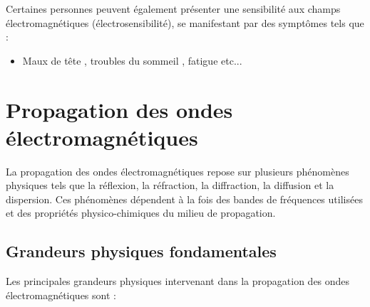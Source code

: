 \documentclass[12pt,a4paper]{article}
\begin{document}
Certaines personnes peuvent également présenter une sensibilité aux champs électromagnétiques (électrosensibilité), se manifestant par des symptômes tels que :

\begin{itemize}
    \item Maux de tête , troubles du sommeil , fatigue etc...
\end{itemize}

\section{Propagation des ondes électromagnétiques}

La propagation des ondes électromagnétiques repose sur plusieurs phénomènes physiques tels que la réflexion, la réfraction, la diffraction, la diffusion et la dispersion. Ces phénomènes dépendent à la fois des bandes de fréquences utilisées et des propriétés physico-chimiques du milieu de propagation.

\subsection{Grandeurs physiques fondamentales}

Les principales grandeurs physiques intervenant dans la propagation des ondes électromagnétiques sont :
\end{document}
